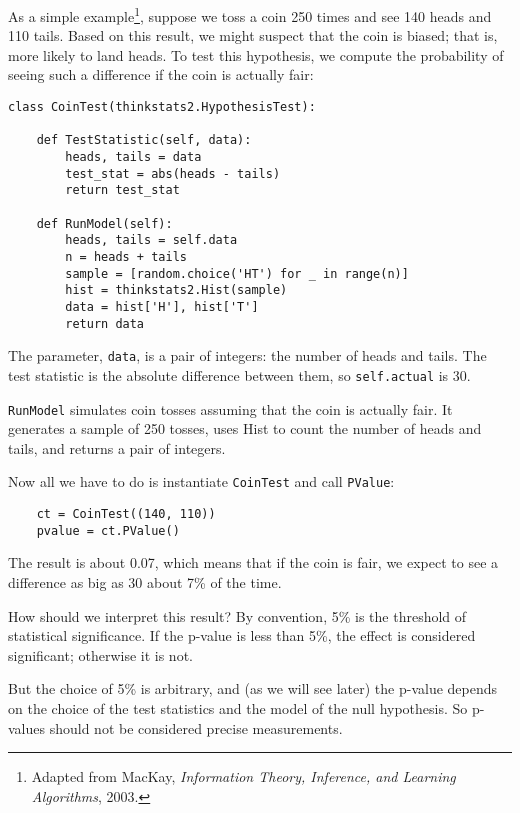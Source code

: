 \documentclass[12pt]{book}
\begin{document}
As a simple example\footnote{Adapted from MacKay, {\it Information
    Theory, Inference, and Learning Algorithms}, 2003.}, suppose we
toss a coin 250 times and see 140 heads and 110 tails.  Based on this
result, we might suspect that the coin is biased; that is, more likely
to land heads.  To test this hypothesis, we compute the
probability of seeing such a difference if the coin is actually
fair:

\begin{verbatim}
class CoinTest(thinkstats2.HypothesisTest):

    def TestStatistic(self, data):
        heads, tails = data
        test_stat = abs(heads - tails)
        return test_stat

    def RunModel(self):
        heads, tails = self.data
        n = heads + tails
        sample = [random.choice('HT') for _ in range(n)]
        hist = thinkstats2.Hist(sample)
        data = hist['H'], hist['T']
        return data
\end{verbatim}

The parameter, {\tt data}, is a pair of
integers: the number of heads and tails.  The test statistic is
the absolute difference between them, so {\tt self.actual}
is 30.

{\tt RunModel} simulates coin tosses assuming that the coin is
actually fair.  It generates a sample of 250 tosses, uses Hist
to count the number of heads and tails, and returns a pair of
integers.

Now all we have to do is instantiate {\tt CoinTest} and call
{\tt PValue}:

\begin{verbatim}
    ct = CoinTest((140, 110))
    pvalue = ct.PValue()
\end{verbatim}

The result is about 0.07, which means that if the coin is
fair, we expect to see a difference as big as 30 about 7\% of the
time.

How should we interpret this result?  By convention,
5\% is the threshold of statistical significance.  If the
p-value is less than 5\%, the effect is considered significant; otherwise
it is not.
 

But the choice of 5\% is arbitrary, and (as we will see later) the
p-value depends on the choice of the test statistics and
the model of the null hypothesis.  So p-values should not be considered
precise measurements.
\end{document}
